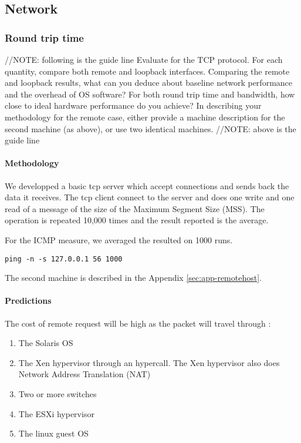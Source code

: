 \subsection{Network}

\subsubsection{Round trip time}

//NOTE: following is the guide line
Evaluate for the TCP protocol. For each quantity, compare both remote and loopback interfaces. Comparing the remote and loopback results, what can you deduce about baseline network performance and the overhead of OS software? For both round trip time and bandwidth, how close to ideal hardware performance do you achieve? In describing your methodology for the remote case, either provide a machine description for the second machine (as above), or use two identical machines.
//NOTE: above is the guide line

\paragraph{Methodology}
We developped a basic tcp server which accept connections and sends back the
data it receives.
The tcp client connect to the server and does one write and one read of a message of
the size of the Maximum Segment Size (MSS).
The operation is repeated 10,000 times and the result reported is the average.

For the ICMP measure, we averaged the resulted on 1000 runs.
\begin{verbatim}
ping -n -s 127.0.0.1 56 1000
\end{verbatim}

The second machine is described in the Appendix \ref{sec:app-remotehost}.

\paragraph{Predictions}
The cost of remote request will be high as the packet will travel through :
\begin{enumerate}
\item The Solaris OS
\item The Xen hypervisor through an hypercall.
The Xen hypervisor also does Network Address Translation (NAT)
\item Two or more switches
\item The ESXi hypervisor
\item The linux guest OS
\end{enumerate}

